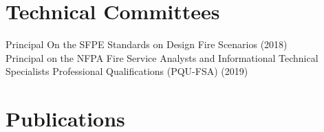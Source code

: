\documentclass[10pt,letterpaper]{article}
\begin{document}
\section*{Technical Committees}

Principal On the SFPE Standards on Design Fire Scenarios (2018) \\
Principal on the NFPA Fire Service Analysts and Informational Technical Specialists Professional Qualifications (PQU-FSA) (2019) \\

\clearpage

\section*{Publications}

\nocite{*}
\printbibliography[title=Journal Articles, type=article]
\printbibliography[title=Book Chapters, type=inbook]
\printbibliography[title=Peer Reviewed Technical Reports, type=report]
\printbibliography[title=In Proceedings, type=inproceedings]

\clearpage
\end{document}
